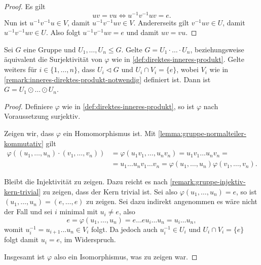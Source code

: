 \begin{proof}
    Es gilt
    $$ uv = vu \Leftrightarrow u^{-1} v^{-1} u v = e. $$
    Nun ist $u^{-1} v^{-1} u \in V$, damit $u^{-1} v^{-1} u v \in V$. Andererseits gilt $v^{-1} u v \in U$, damit $u^{-1} v^{-1} u v \in U$. Also folgt $u^{-1} v^{-1} u v = e$ und damit $uv=vu$.
\end{proof}

\begin{proposition} \label{prop:kriterien-direktes-inneres-produkt}
    Sei $G$ eine Gruppe und $U_1, \hdots, U_n \leq G$. Gelte $G = U_1 \cdot \hdots \cdot U_n$, beziehungsweise äquivalent die Surjektivität von $\varphi$ wie in \cref{def:direktes-inneres-produkt}. Gelte weiters für $i \in \{ 1, \hdots, n \} $, dass $U_i \vartriangleleft G$ und $U_i \cap V_i = \{ e \} $, wobei $V_i$ wie in \cref{remark:inneres-direktes-produkt-notwendig} definiert ist. Dann ist $G = U_1 \odot \hdots \odot U_n $.
\end{proposition}

\begin{proof}
    Definiere $\varphi$ wie in \cref{def:direktes-inneres-produkt}, so ist $\varphi$ nach Voraussetzung surjektiv.

    Zeigen wir, dass $\varphi$ ein Homomorphismus ist. Mit \cref{lemma:gruppe-normalteiler-kommutativ} gilt
    \begin{align*}        
        \varphi((u_1, \hdots, u_n) \cdot (v_1, \hdots, v_n)) &= \varphi(u_1 v_1, \hdots, u_n v_n) = u_1 v_1 \hdots u_n v_n = \\ &= u_1 \hdots u_n v_1 \hdots v_n = \varphi(u_1, \hdots, u_n) \varphi(v_1, \hdots, v_n).
    \end{align*}

    Bleibt die Injektivität zu zeigen. Dazu reicht es nach \cref{remark:gruppe-injektiv-kern-trivial} zu zeigen, dass der Kern trivial ist. Sei also $\varphi(u_1, \hdots, u_n) = e$, so ist $(u_1, \hdots, u_n) = (e, \hdots, e)$ zu zeigen. Sei dazu indirekt angenommen es wäre nicht der Fall und sei $i$ minimal mit $u_i \neq e$, also
    $$ e = \varphi(u_1, \hdots, u_n) = e \hdots e u_i \hdots u_n = u_i \hdots u_n, $$
    womit $u_i^{-1} = u_{i+1} ... u_n \in V_i$ folgt. Da jedoch auch $u_i^{-1} \in U_i$ und $U_i \cap V_i = \{ e \}$ folgt damit $u_i = e$, im Widerspruch.

    Insgesamt ist $\varphi$ also ein Isomorphismus, was zu zeigen war.
\end{proof}

